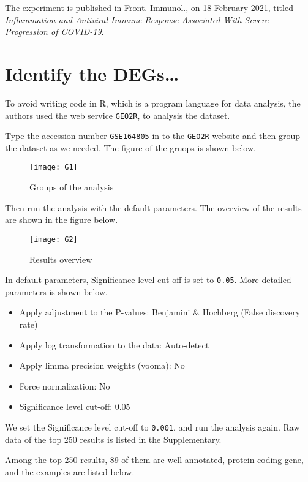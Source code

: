 \documentclass[en,black,12pt,normal]{elegantnote}
\newcommand{\upcite}[1]{\textsuperscript{\textsuperscript{\cite{#1}}}}
\begin{document}
The experiment is published in Front. Immunol., on 18 February 2021, 
titled \textit{Inflammation and Antiviral Immune Response Associated With Severe Progression of COVID-19}.\upcite{fimmu2021}

\section{Identify the DEGs\dots}

To avoid writing code in R, which is a program language for data analysis, the authors used the web service \lstinline{GEO2R},
to analysis the dataset.

Type the accession number \lstinline{GSE164805} in to the \lstinline{GEO2R} website
and then group the dataset as we needed. The figure of the gruops is shown below.

\begin{figure}[H]
    \centering
    \texttt{[image: G1]}
    \caption{Groups of the analysis}
    \label{G1}
\end{figure}

Then run the analysis with the default parameters. The overview of the results are shown in the figure below.

\begin{figure}[H]
    \centering
    \texttt{[image: G2]}
    \caption{Results overview}
    \label{G2}
\end{figure}

In default parameters, Significance level cut-off is set to \lstinline{0.05}.
More detailed parameters is shown below.

\begin{itemize}
    \item Apply adjustment to the P-values: Benjamini \& Hochberg (False discovery rate)
    \item Apply log transformation to the data: Auto-detect
    \item Apply limma precision weights (vooma): No
    \item Force normalization: No
    \item Significance level cut-off: 0.05
\end{itemize}

We set the Significance level cut-off to \lstinline{0.001}, and run the analysis again.
Raw data of the top 250 results is listed in the Supplementary.

Among the top 250 results, 89 of them are well annotated, protein coding gene, and the examples are listed below.
\end{document}
